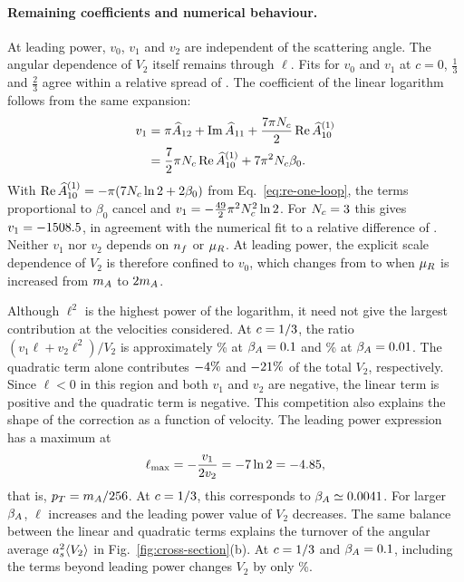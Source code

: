 \paragraph{Remaining coefficients and numerical behaviour.}

At leading power, $v_0$, $v_1$ and $v_2$ are independent of the scattering
angle. The angular dependence of $V_2$ itself remains through $\ell$.
Fits for $v_0$ and $v_1$ at $c=0$, $\tfrac13$ and $\tfrac23$
agree within a relative spread of \VtwoAngleSpread{}.
The coefficient of the linear logarithm follows from the same expansion:
\begin{align*}
 v_1
 &=\pi\widehat A_{12}
   +\operatorname{Im}\widehat A_{11}
   +\frac{7\pi N_c}{2}
    \operatorname{Re}\widehat A^{(1)}_{10}
 \\
 &=\frac72\pi N_c\operatorname{Re}\widehat A^{(1)}_{10}
   +7\pi^2N_c\beta_0.
\end{align*}
With $\operatorname{Re}\widehat A^{(1)}_{10}=-\pi(7N_c\ln2+2\beta_0)$ from
Eq.~\eqref{eq:re-one-loop}, the terms proportional to $\beta_0$ cancel and
$v_1=-\tfrac{49}{2}\pi^2N_c^2\ln2$.
For $N_c=3$ this gives $v_1=-1508.5$, in agreement with
the numerical fit to a relative difference of \VoneFormulaDev{}.
Neither $v_1$ nor $v_2$ depends on $n_f$ or $\mu_R$. At leading power, the explicit scale dependence of $V_2$
is therefore confined to $v_0$, which changes from \VzeroBench{}
to \VzeroTwoMu{} when $\mu_R$ is increased from $m_A$ to $2m_A$.

Although $\ell^2$ is the highest power of the logarithm, it need
not give the largest contribution at the velocities considered.
At $c=1/3$, the ratio $(v_1\ell+v_2\ell^2)/V_2$ is
approximately \LogShareLarge\% at $\beta_A=0.1$
and \LogShareSmall\% at $\beta_A=0.01$.
The quadratic term alone contributes $-4\%$ and
$-21\%$ of the total $V_2$, respectively.
Since $\ell<0$ in this region and both $v_1$ and $v_2$ are
negative, the linear term is positive and the quadratic term is negative.
This competition also explains the shape of the correction as a
function of velocity. The leading power expression has a maximum at
\[
 \ell_{\mathrm{max}}
 =-\frac{v_1}{2v_2}
 =-7\ln2
 =-4.85,
\]
that is, $p_T=m_A/256$.
At $c=1/3$, this corresponds to $\beta_A\simeq0.0041$.
For larger $\beta_A$, $\ell$ increases and the leading power value of
$V_2$ decreases. The same balance between the linear and quadratic
terms explains the turnover of the angular average
$a_s^2\langle V_2\rangle$ in Fig.~\ref{fig:cross-section}(b).
At $c=1/3$ and $\beta_A=0.1$,
including the terms beyond leading power changes $V_2$ by only \LeadPowerDevLarge\%.

